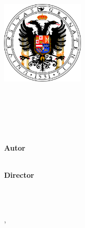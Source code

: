 \begin{titlepage}
    \begin{addmargin}[-1cm]{-3cm}
    \begin{center}
        \large

        \hfill

        \vfill

        \includegraphics[width=4cm]{gfx/logo_ugr2} %

        \vfill

        \spacedallcaps{\mySubtitle} \\ \bigskip

        \spacedlowsmallcaps{\myDegree} \\ \bigskip \bigskip


        \begingroup
            \color{Maroon}\spacedallcaps{\LARGE\myTitle} \\ \bigskip
        \endgroup

        \vfill

        \textbf{Autor} \\
        \myName \\ \medskip

        \textbf{Director} \\
        \myProf \\ \medskip

        \vfill

        \spacedlowsmallcaps{\myUni} \\ \medskip

        \myLocation, \myTime %

        \vfill

    \end{center}
  \end{addmargin}
\end{titlepage}
